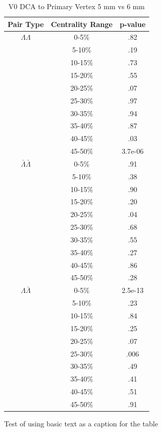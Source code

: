 \begin{table}
\caption {V0 DCA to Primary Vertex 5 mm vs 6 mm} \label{tab:V0DcaPrimVertPvalueTests5mmVs4mm}
\begin{center}
\begin{tabular}{| c | c | c |}
  \hline                       
  Pair Type & Centrality Range & p-value \\
  \hline
  $\Lambda\Lambda$ & 0-5\% &  .82 \\
   & 5-10\%  & .19 \\
   & 10-15\% & .73 \\
   & 15-20\% & .55 \\
   & 20-25\% & .07 \\
   & 25-30\% & .97 \\
   & 30-35\% & .94 \\
   & 35-40\% & .87 \\
   & 40-45\% & .03 \\
   & 45-50\% & 3.7e-06 \\
   \hline
  $\bar{\Lambda}\bar{\Lambda}$ &  0-5\% & .91 \\
   & 5-10\% & .38 \\
   & 10-15\% & .90 \\
   & 15-20\% & .20 \\
   & 20-25\% & .04 \\
   & 25-30\% & .68 \\
   & 30-35\% & .55 \\
   & 35-40\% & .27 \\
   & 40-45\% & .86 \\
   & 45-50\% & .28 \\
   \hline
  $\Lambda\bar{\Lambda}$ &  0-5\% & 2.5e-13 \\
   & 5-10\% & .23 \\
   & 10-15\% & .84 \\
   & 15-20\% & .25 \\
   & 20-25\% & .07 \\
   & 25-30\% & .006 \\
   & 30-35\% & .49 \\
   & 35-40\% & .41 \\
   & 40-45\% & .51 \\
   & 45-50\% & .91 \\
  \hline  
\end{tabular}
Test of using basic text as a caption for the table
\end{center}
\end{table}




